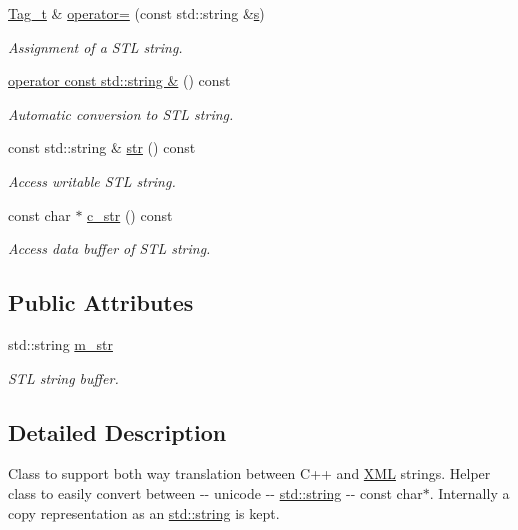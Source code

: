 \begin{DoxyCompactItemize}
\hyperlink{class_d_d4hep_1_1_x_m_l_1_1_tag__t}{Tag\_\-t} \& \hyperlink{class_d_d4hep_1_1_x_m_l_1_1_tag__t_aba04bd331a49bea4bdc163fe36522e84}{operator=} (const std::string \&\hyperlink{_volumes_8cpp_a17ca6bfc8040d695d3cada22a4763d40}{s})
\begin{DoxyCompactList}\small\item\em Assignment of a STL string. \item\end{DoxyCompactList}\item 
\hyperlink{class_d_d4hep_1_1_x_m_l_1_1_tag__t_a08b49a574cd5322b0456c9da73231394}{operator const std::string \&} () const 
\begin{DoxyCompactList}\small\item\em Automatic conversion to STL string. \item\end{DoxyCompactList}\item 
const std::string \& \hyperlink{class_d_d4hep_1_1_x_m_l_1_1_tag__t_a64c06a11bc70eadc254e6a8416648284}{str} () const 
\begin{DoxyCompactList}\small\item\em Access writable STL string. \item\end{DoxyCompactList}\item 
const char $\ast$ \hyperlink{class_d_d4hep_1_1_x_m_l_1_1_tag__t_a0ba8d69ddce7d8b47ede593a3bbf8a60}{c\_\-str} () const 
\begin{DoxyCompactList}\small\item\em Access data buffer of STL string. \item\end{DoxyCompactList}\end{DoxyCompactItemize}
\subsection*{Public Attributes}
\begin{DoxyCompactItemize}
\item 
std::string \hyperlink{class_d_d4hep_1_1_x_m_l_1_1_tag__t_aab9eff18240d6d98b8d8063792198e91}{m\_\-str}
\begin{DoxyCompactList}\small\item\em STL string buffer. \item\end{DoxyCompactList}\end{DoxyCompactItemize}


\subsection{Detailed Description}
Class to support both way translation between C++ and \hyperlink{namespace_d_d4hep_1_1_x_m_l}{XML} strings. Helper class to easily convert between -\/-\/ unicode -\/-\/ \hyperlink{classstd_1_1string}{std::string} -\/-\/ const char$\ast$. Internally a copy representation as an \hyperlink{classstd_1_1string}{std::string} is kept.

